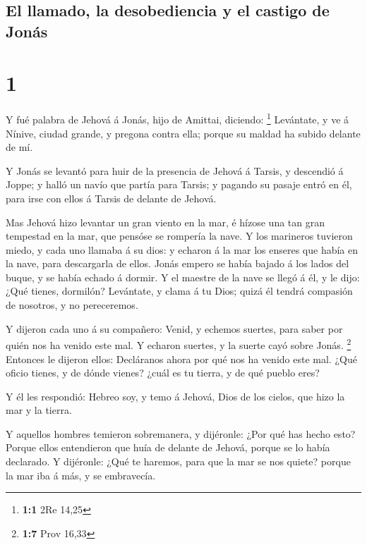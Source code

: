 \hypertarget{el-llamado-la-desobediencia-y-el-castigo-de-jonuxe1s}{%
\subsection{El llamado, la desobediencia y el castigo de
Jonás}\label{el-llamado-la-desobediencia-y-el-castigo-de-jonuxe1s}}

\hypertarget{section}{%
\section{1}\label{section}}

 Y fué palabra de Jehová á Jonás, hijo de Amittai, diciendo:
\footnote{\textbf{1:1} 2Re 14,25}  Levántate, y ve á Nínive,
ciudad grande, y pregona contra ella; porque su maldad ha subido delante
de mí.

 Y Jonás se levantó para huir de la presencia de Jehová á
Tarsis, y descendió á Joppe; y halló un navío que partía para Tarsis; y
pagando su pasaje entró en él, para irse con ellos á Tarsis de delante
de Jehová.

 Mas Jehová hizo levantar un gran viento en la mar, é hízose
una tan gran tempestad en la mar, que pensóse se rompería la nave.
 Y los marineros tuvieron miedo, y cada uno llamaba á su
dios: y echaron á la mar los enseres que había en la nave, para
descargarla de ellos. Jonás empero se había bajado á los lados del
buque, y se había echado á dormir.  Y el maestre de la nave
se llegó á él, y le dijo: ¿Qué tienes, dormilón? Levántate, y clama á tu
Dios; quizá él tendrá compasión de nosotros, y no pereceremos.

 Y dijeron cada uno á su compañero: Venid, y echemos
suertes, para saber por quién nos ha venido este mal. Y echaron suertes,
y la suerte cayó sobre Jonás. \footnote{\textbf{1:7} Prov 16,33}
 Entonces le dijeron ellos: Decláranos ahora por qué nos ha
venido este mal. ¿Qué oficio tienes, y de dónde vienes? ¿cuál es tu
tierra, y de qué pueblo eres?

 Y él les respondió: Hebreo soy, y temo á Jehová, Dios de
los cielos, que hizo la mar y la tierra.

 Y aquellos hombres temieron sobremanera, y dijéronle: ¿Por
qué has hecho esto? Porque ellos entendieron que huía de delante de
Jehová, porque se lo había declarado.  Y dijéronle: ¿Qué te
haremos, para que la mar se nos quiete? porque la mar iba á más, y se
embravecía.


